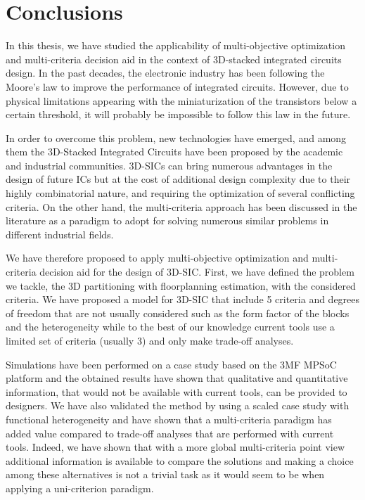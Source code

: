 \chapter{Conclusions}
\label{cha:conclusions}
\fancyhead[RE]{\bfseries\leftmark}

In this thesis, we have studied the applicability of multi-objective optimization and multi-criteria decision aid in the context of 3D-stacked integrated circuits design. In the past decades, the electronic industry has been following the Moore’s law to improve the performance of integrated circuits. However, due to physical limitations appearing with the miniaturization of the transistors below a certain threshold, it will probably be impossible to follow this law in the future.

In order to overcome this problem, new technologies have emerged, and among them the 3D-Stacked Integrated Circuits have been proposed by the academic and industrial communities. 3D-SICs can bring numerous advantages in the design of future ICs but at the cost of additional design complexity due to their highly combinatorial nature, and requiring the optimization of several conflicting criteria. On the other hand, the multi-criteria approach has been discussed in the literature as a paradigm to adopt for solving numerous similar problems in different industrial fields.

We have therefore proposed to apply multi-objective optimization and multi-criteria decision aid for the design of 3D-SIC. First, we have defined the problem we tackle, the 3D partitioning with floorplanning estimation, with the considered criteria. We have proposed a model for 3D-SIC that include 5 criteria and degrees of freedom that are not usually considered such as the form factor of the blocks and the heterogeneity while to the best of our knowledge current tools use a limited set of criteria (usually 3) and only make trade-off analyses.

Simulations have been performed on a case study based on the 3MF MPSoC platform and the obtained results have shown that qualitative and quantitative information, that would not be available with current tools, can be provided to designers. We have also validated the method by using a scaled case study with functional heterogeneity and have shown that a multi-criteria paradigm has added value compared to trade-off analyses that are performed with current tools. Indeed, we have shown that with a more global multi-criteria point view additional information is available to compare the solutions and making a choice among these alternatives is not a trivial task as it would seem to be when applying a uni-criterion paradigm.

